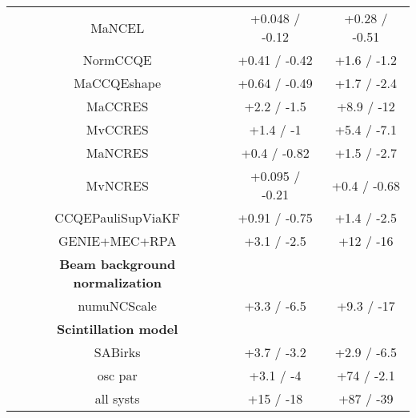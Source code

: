\begin{table*}[t]
\begin{tabular}{c c c}
    MaNCEL & +0.048 / -0.12 & +0.28 / -0.51\\
    NormCCQE & +0.41 / -0.42 & +1.6 / -1.2\\
    MaCCQEshape & +0.64 / -0.49 & +1.7 / -2.4\\
    MaCCRES & +2.2 / -1.5 & +8.9 / -12\\
    MvCCRES & +1.4 / -1 & +5.4 / -7.1\\
    MaNCRES & +0.4 / -0.82 & +1.5 / -2.7\\
    MvNCRES & +0.095 / -0.21 & +0.4 / -0.68\\
    CCQEPauliSupViaKF & +0.91 / -0.75 & +1.4 / -2.5\\
    \hline
    GENIE+MEC+RPA & +3.1 / -2.5 & +12 / -16\\
    \textbf{Beam background normalization} & & \\
    numuNCScale & +3.3 / -6.5 & +9.3 / -17\\
    \textbf{Scintillation model} & & \\
    SABirks & +3.7 / -3.2 & +2.9 / -6.5\\
    \hline 
    osc par & +3.1 / -4 & +74 / -2.1\\
    \hline
    all systs & +15 / -18 & +87 / -39\\
    \hline
  \end{tabular}
  \label{tab:systShifts}
\end{table*}





